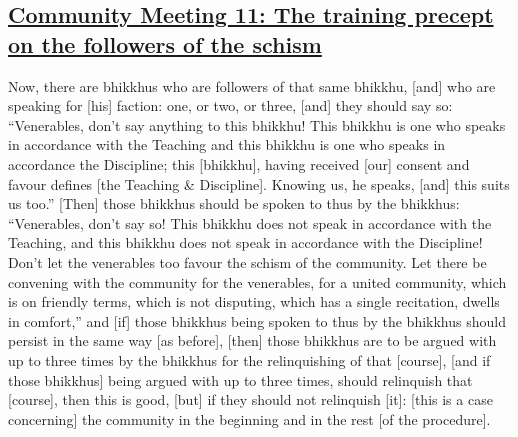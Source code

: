 \subsection*{\hyperref[sd11]{Community Meeting 11: The training precept on the followers of the schism}}
\label{comm11}
Now, there are bhikkhus who are followers of that same bhikkhu, [and] who are speaking for [his] faction: one, or two, or three, [and] they should say so: ``Venerables, don't say anything to this bhikkhu! This bhikkhu is one who speaks in accordance with the Teaching and this bhikkhu is one who speaks in accordance the Discipline; this [bhikkhu], having received [our] consent and favour defines [the Teaching \& Discipline]. Knowing us, he speaks, [and] this suits us too.'' [Then] those bhikkhus should be spoken to thus by the bhikkhus: ``Venerables, don't say so! This bhikkhu does not speak in accordance with the Teaching, and this bhikkhu does not speak in accordance with the Discipline! Don't let the venerables too favour the schism of the community. Let there be convening with the community for the venerables, for a united community, which is on friendly terms, which is not disputing, which has a single recitation, dwells in comfort,'' and [if] those bhikkhus being spoken to thus by the bhikkhus should persist in the same way [as before], [then] those bhikkhus are to be argued with up to three times by the bhikkhus for the relinquishing of that [course], [and if those bhikkhus] being argued with up to three times, should relinquish that [course], then this is good, [but] if they should not relinquish [it]: [this is a case concerning] the community in the beginning and in the rest [of the procedure].

